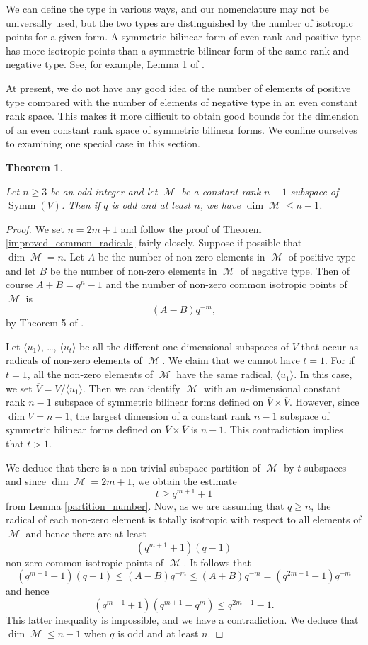 \documentclass{amsart}
\DeclareMathOperator{\M}{\mathcal{M}}
\DeclareMathOperator{\Symm}{Symm}
\theoremstyle{plain}
\newtheorem{theorem}{Theorem}
\theoremstyle{definition}
\begin{document}
We can define the type in various ways, and our nomenclature may not be universally used, but the two types are distinguished by the number of isotropic points for a given form. A symmetric bilinear form of even rank and positive type has more isotropic points than a symmetric bilinear form of the same rank
and negative type. See, for example, Lemma 1 of \cite{DGS}.

At present, we do not have any good idea of the number of elements of positive type compared with the number of elements of negative type
in an even constant rank space. This makes it more difficult to obtain good bounds for the dimension of an even constant rank
space  of symmetric bilinear forms. We confine ourselves to examining one special case in this section.

\begin{theorem} \label{even_constant_rank_dimension}
 
Let $n\geq 3$ be an odd integer and let $\M$ be a constant rank $n-1$ subspace of  $\Symm(V)$. Then if $q$ is odd and at least $n$, we have $\dim \M\leq n-1$. 
\end{theorem}

\begin{proof}
 We set $n=2m+1$ and follow the proof of Theorem \ref{improved_common_radicals} fairly closely.
Suppose if possible that $\dim \M=n$. Let $A$ be the number of non-zero elements in $\M$ of positive type and let 
$B$ be the number of non-zero elements in $\M$ of negative type. Then of course $A+B=q^n-1$ and the number of non-zero 
common isotropic points of $\M$ is
\[
 (A-B)q^{-m},
\]
by Theorem 5 of \cite{DGS}. 

Let $\langle u_1\rangle$, \dots, $\langle u_t\rangle$ be all the different one-dimensional subspaces of $V$ that occur as radicals of non-zero elements of $\M$. We claim that we cannot have $t=1$. For if $t=1$, all the non-zero elements of $\M$ have the same radical, 
$\langle u_1\rangle$. In this case, we set $\overline{V}=V/\langle u_1\rangle$. Then we can identify $\M$ with an $n$-dimensional constant rank
$n-1$ subspace of symmetric bilinear forms defined on $\overline{V}\times \overline{V}$. However, since $\dim \overline{V}=n-1$, the largest
dimension of a constant rank $n-1$ subspace of symmetric bilinear forms defined on $\overline{V}\times \overline{V}$ is $n-1$. This contradiction implies that $t>1$. 

We deduce that there is a non-trivial subspace partition of $\M$ by $t$ subspaces and since $\dim \M=2m+1$, we obtain the estimate
\[
 t\geq q^{m+1}+1
\]
from Lemma \ref{partition_number}. Now, as we are assuming that $q\geq n$, the radical of each non-zero element is totally isotropic
with respect to all elements of $\M$ and hence there are at least
\[
 (q^{m+1}+1)(q-1)
\]
non-zero common isotropic points of $\M$. It follows that
\[
 (q^{m+1}+1)(q-1)\leq (A-B)q^{-m}\leq (A+B)q^{-m}=(q^{2m+1}-1)q^{-m}
\]
and hence 
\[
 (q^{m+1}+1)(q^{m+1}-q^m)\leq q^{2m+1}-1.
\]
This latter inequality is impossible, and we have a contradiction. We deduce that $\dim \M\leq n-1$ when $q$ is odd and at least $n$.



\end{proof}
\end{document}
